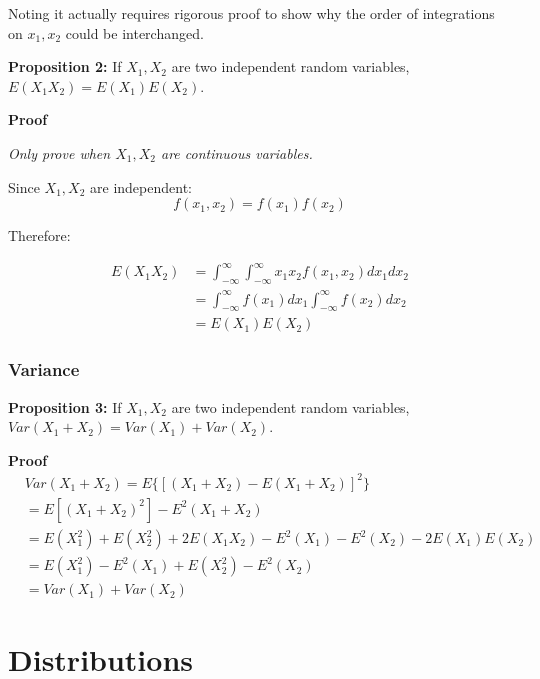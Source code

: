 \documentclass{article}
\begin{document}
Noting it actually requires rigorous proof to show why the order of
integrations on \(x_1, x_2\) could be interchanged.

\vspace{2mm}
\textbf{Proposition 2:} If \(X_1, X_2\) are two independent random variables,
\(E(X_1X_2)=E(X_1)E(X_2)\).

\vspace{2mm}
\textbf{Proof}

\textit{Only prove when \(X_1, X_2\) are continuous variables.}

Since \(X_1, X_2\) are independent:
\begin{equation}
    f(x_1, x_2)=f(x_1)f(x_2)
\end{equation}

Therefore:

\begin{equation}
\begin{split}
    E(X_1X_2)&=\int_{-\infty}^{\infty}\int_{-\infty}^{\infty}
    x_1x_2f(x_1, x_2)dx_1dx_2\\
    &=\int_{-\infty}^{\infty}f(x_1)dx_1\int_{-\infty}^{\infty}f(x_2)dx_2\\
    &=E(X_1)E(X_2)
\end{split}
\end{equation}

\subsubsection{Variance}

\vspace{2mm}
\textbf{Proposition 3:} If \(X_1, X_2\) are two independent random variables,
\(Var(X_1+X_2)=Var(X_1)+Var(X_2)\).

\vspace{2mm}
\textbf{Proof}
\begin{equation}
\begin{split}
    &Var(X_1+X_2)=E\{[(X_1+X_2)-E(X_1+X_2)]^2\}\\
    &=E[(X_1+X_2)^2]-E^2(X_1+X_2)\\
    &=E(X_1^2)+E(X_2^2)+2E(X_1X_2)-E^2(X_1)-E^2(X_2)-2E(X_1)E(X_2)\\
    &=E(X_1^2)-E^2(X_1)+E(X_2^2)-E^2(X_2)\\
    &=Var(X_1)+Var(X_2)
\end{split}
\end{equation}

\section{Distributions}
\end{document}
